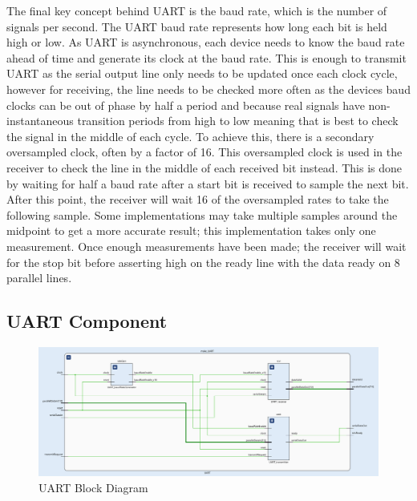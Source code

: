 \documentclass[11pt]{article}
\begin{document}
The final key concept behind UART is the baud rate, which is the number of signals per second.
The UART baud rate represents how long each bit is held high or low.
As UART is asynchronous, each device needs to know the baud rate ahead of time and generate its clock at the baud rate.
This is enough to transmit UART as the serial output line only needs to be updated once each clock cycle,
however for receiving, the line needs to be checked more often as the devices baud clocks can be out of phase by half a period and because real signals have non-instantaneous transition periods from high to low meaning that is best to check the signal in the middle of each cycle.
To achieve this, there is a secondary oversampled clock, often by a factor of 16.
This oversampled clock is used in the receiver to check the line in the middle of each received bit instead.
This is done by waiting for half a baud rate after a start bit is received to sample the next bit.
After this point, the receiver will wait 16 of the oversampled rates to take the following sample.
Some implementations may take multiple samples around the midpoint to get a more accurate result; this implementation takes only one measurement.
Once enough measurements have been made; the receiver will wait for the stop bit before asserting high on the ready line with the data ready on 8 parallel lines.


\subsection{UART Component}
\begin{figure}[H]        
    \centering
    \includegraphics[width=\textwidth]{uartImp.png}
    \caption{UART Block Diagram}
    \label{fig:UARTimp}
\end{figure} 
\end{document}
